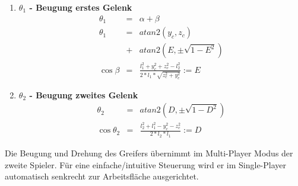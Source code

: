 \documentclass[portrait,a0paper]{baposter}
\begin{document}
\begin{poster}
{\begin{enumerate}
	\item \textbf{$\theta_1$ - Beugung erstes Gelenk}
\begin{eqnarray*}
\theta_1 &=& \alpha + \beta \\
\theta_1 &=& atan2(y_c, z_c)\\ &+& atan2(E, \pm \sqrt{1-E^2}) \\
\cos \beta &=& \frac{l_1^2 + y_c^2 + z_c^2 - l_2^2}{2*l_1*\sqrt{z_c^2 + y_c^2}} := E 
	\end{eqnarray*}

	\item \textbf{$\theta_2$ - Beugung zweites Gelenk}
\begin{eqnarray*}
\theta_2 &=& atan2(D, \pm \sqrt{1-D^2}) \\
\cos \theta_2 &=& \frac{l_2^2 + l_1^2 - y_c^2 - z_c^2}{2*l_2*l_1} :=D
\end{eqnarray*}	
\end{enumerate}
	
Die Beugung und Drehung des Greifers übernimmt im Multi-Player Modus der zweite Spieler. Für eine einfache/intuitive Steuerung wird er im Single-Player automatisch senkrecht zur Arbeitsfläche ausgerichtet.
	  



}
\end{poster}
\end{document}
